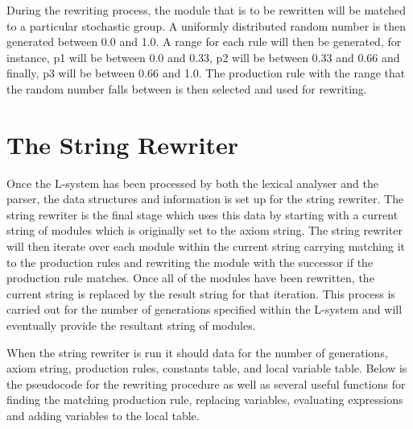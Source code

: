 During the rewriting process, the module that is to be rewritten will be matched to a particular stochastic group. A uniformly distributed random number is then generated between 0.0 and 1.0. A range for each rule will then be generated, for instance, p1 will be between 0.0 and 0.33, p2 will be between 0.33 and 0.66 and finally, p3 will be between 0.66 and 1.0. The production rule with the range that the random number falls between is then selected and used for rewriting. 

\section{The String Rewriter}

Once the L-system has been processed by both the lexical analyser and the parser, the data structures and information is set up for the string rewriter. The string rewriter is the final stage which uses this data by starting with a current string of modules which is originally set to the axiom string. The string rewriter will then iterate over each module within the current string carrying matching it to the production rules and rewriting the module with the successor if the production rule matches. Once all of the modules have been rewritten, the current string is replaced by the result string for that iteration. This process is carried out for the number of generations specified within the L-system and will eventually provide the resultant string of modules.

When the string rewriter is run it should data for the number of generations, axiom string, production rules, constants table, and local variable table. Below is the pseudocode for the rewriting procedure as well as several useful functions for finding the matching production rule, replacing variables, evaluating expressions and adding variables to the local table. 

